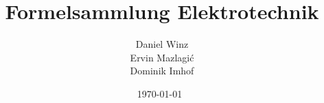 \documentclass[a5paper,10pt,fleqn]{book}
\title{Formelsammlung Elektrotechnik}
\author{Daniel Winz\\Ervin Mazlagi\'c\\Dominik Imhof}
\date{\today~\dtc}
\begin{document}
\maketitle
\textbf{}


\tableofcontents



% 














\end{document}
